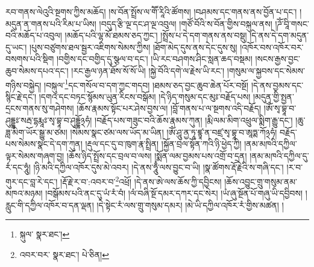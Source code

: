 རབ་གནས་ལེའུའི་སྔགས་ཀྱིས་མཆོད། །ས་བོན་སྤྲོས་ལ་གཽ་རཱིའི་ཚོགས། །བཤམས་དང་གནས་ནས་བྱོན་པ་དང་། །མདུན་ན་གནས་པའི་རིམ་པ་ཡིས། །བདུད་རྩི་ལྔ་དང་ཤ་ལྔ་འབུལ། །གཙོ་བོའི་ས་བོན་གྱིས་བསྐུལ་ནས། །ཌོཾ་བཱི་གསང་བའི་མཆོད་པ་འབུལ། །མཆོད་པའི་ལྷ་མོ་ཐམས་ཅད་ཀྱང་། །སྤྲོས་པ་དེ་དག་གནས་ནས་བསྡུ། །དེ་ནས་དེ་དག་མདུན་དུ་ཡང་། །པུས་བཙུགས་ཐལ་སྦྱར་འཇིགས་སེམས་ཀྱིས། །ཐོག་མེད་དུས་ནས་དེང་དུས་སུ། །འཁོར་བས་འཁོར་བར་བསགས་པའི་སྡིག །བགྱིས་དང་བགྱིད་དུ་སྩལ་བ་དང་། །ཡི་རང་བཤགས་ཤིང་སླན་ཆད་བསྡམ། །སངས་རྒྱས་བྱང་ཆུབ་སེམས་དཔའ་དང་། །རང་རྒྱལ་ཉན་ཐོས་སོ་སོ་ཡི། །སྐྱེ་བོའི་དགེ་ལ་རྗེས་ཡི་རང་། །གསུམ་ལ་སྐྱབས་དང་སེམས་གཉིས་བསྐྱེད། །བསྐུལ་\footnote{སྐུལ་  སྣར་ཐང་། }དང་གསོལ་བ་དག་ཀྱང་གདབ། །ཐམས་ཅད་བྱང་ཆུབ་ཆེན་པོར་བསྔོ། །དེ་ནས་བྱམས་དང་སྙིང་རྗེ་དང་། །དགའ་དང་བཏང་སྙོམས་ཡུན་རིངས་བསྒོམ། །དེ་ཉིད་གསུམ་དང་མུཿ་བརྗོད་པས། །མདུན་གྱི་སྤྱན་དྲངས་གནས་སུ་གཤེགས། །ཆོས་རྣམས་སྟོང་པར་ཤེས་བྱས་ལ། །བློ་གནས་པ་ལ་སྔགས་འདི་བརྗོད། །ཨོཾ་སྭ་བྷཱ་བ་ཤུདྡྷཿ་སརྦ་དྷརྨཱཿ་སྭ་བྷཱ་བ་ཤུདྡྷོ྅ཧཾ། །བརྗོད་པས་གཟུང་བའི་ཆོས་རྣམས་ཀུན། །རྨི་ལམ་མིག་འཕྲུལ་སྨིག་རྒྱུ་དང་། །ཆུ་ཟླ་མིག་ཡོར་སྒྱུ་མ་ཙམ། །སེམས་སྣང་ཙམ་ལས་ཡོད་མ་ཡིན། །ཨོཾ་ཤཱུ་ནྱ་ཏཱ་ཛྙཱ་ན་བཛྲ་སྭ་བྷཱ་བ་ཨཱཏྨ་ཀོ྅ཧཾ། བརྗོད་པས་སེམས་སྣང་དེ་དག་ཀུན། །རྡུལ་དང་དུ་བ་ཁུག་རྣ་སྤྲིན། །སྐྱོན་བྲལ་སྟོན་ཀའི་ཉི་ཕྱེད་ཀྱི། །ནམ་མཁའི་དཀྱིལ་ལྟར་སེམས་གཞག་བྱ། །ཆོས་ཉིད་སྤྲོས་དང་བྲལ་བ་ལས། །སྨོན་ལམ་བྱམས་པས་འགྲོ་བ་དྲན། །ནམ་མཁའི་དཀྱིལ་དུ་རཾ་དང་ཧཱུཾ། །ཉི་མའི་དཀྱིལ་འཁོར་དུས་མེ་འབར། །དེ་ནས་ཧཱུྃ་ལས་བྱུང་བ་ཡི། །སྣ་ཚོགས་རྡོ་རྗེའི་ས་གཞི་དང་། །ར་བ་གུར་དང་བླ་རེ་དང་། །རྡོ་རྗེ་ར་བ་:འབར་བ་\footnote{འབར་བར་  སྣར་ཐང་།  པེ་ཅིན། }འཕྲོ། །དེ་ནས་ཨེ་ལས་ཆོས་ཀྱི་དབྱིངས། །ཆོས་འབྱུང་གྲུ་གསུམ་ནམ་མཁའ་མཉམ། །བསྒོམས་པའི་ནང་དུ་ཡཾ་རཾ་བཾ། །ལཾ་བཞི་སྔོ་དམར་དཀར་དང་སེར། །ཡཾ་ཞུ་སྔོན་པོ་གཞུ་ཡི་དབྱིབས། །རླུང་གི་དཀྱིལ་འཁོར་བ་དན་ལྡན། །དེ་སྟེང་རཾ་ལས་གྲུ་གསུམ་དམར། །མེ་ཡི་དཀྱིལ་འཁོར་རཾ་གྱིས་མཚན། །
